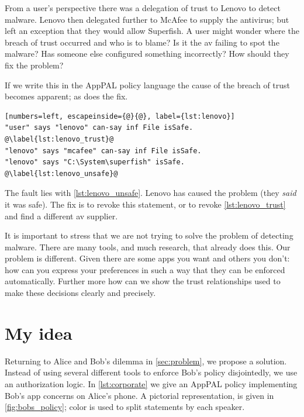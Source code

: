 \documentclass[a4paper]{scrartcl}
\newcommand{\comment}[1]{}%
\begin{document}
From a user's perspective there was a delegation of trust to Lenovo to detect malware.
Lenovo then delegated further to McAfee to supply the antivirus; but left an exception that they would allow Superfish.
A user might wonder where the breach of trust occurred and who is to blame?  
Is it the \ac{av} failing to spot the malware? 
Has someone else configured something incorrectly?
How should they fix the problem?

If we write this in the AppPAL policy language the cause of the breach of trust becomes apparent; as does the fix.
\begin{lstlisting}[numbers=left, escapeinside={@}{@}, label={lst:lenovo}]
"user" says "lenovo" can-say inf File isSafe. @\label{lst:lenovo_trust}@
"lenovo" says "mcafee" can-say inf File isSafe.
"lenovo" says "C:\System\superfish" isSafe. @\label{lst:lenovo_unsafe}@
\end{lstlisting}
The fault lies with \autoref{lst:lenovo_unsafe}.  
Lenovo has caused the problem (they \emph{said} it was safe).
The fix is to revoke this statement, or to revoke \autoref{lst:lenovo_trust} and find a different \ac{av} supplier.

It is important to stress that we are not trying to solve the problem of detecting malware.
There are many tools, and much research, that already does this.
Our problem is different. 
Given there are some apps you want and others you don't:
  how can you express your preferences in such a way that they can be enforced automatically.
Further more how can we show the trust relationships used to make these decisions clearly and precisely.

\section{My idea \comment{2 pages}}
\label{sec:idea}

Returning to Alice and Bob's dilemma in \autoref{sec:problem}, we propose a solution.
Instead of using several different tools to enforce Bob's policy disjointedly, we use an authorization logic.
In \autoref{lst:corporate} we give an AppPAL policy implementing Bob's app concerns on Alice's phone.
A pictorial representation, is given in \autoref{fig:bobs_policy}; color is used to split statements by each speaker.
\end{document}
